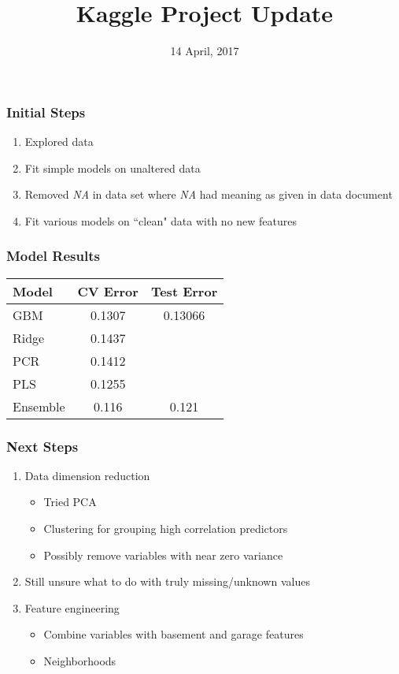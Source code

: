\documentclass[xcolor=dvipsnames]{beamer}
\title[Machine Learning]{Kaggle Project Update}
\author[Stat 602]{}
\date{14 April, 2017}
\begin{document}
\begin{frame}
\titlepage
\end{frame}

\begin{frame}\frametitle{Initial Steps}

\begin{enumerate}
\item Explored data
\item Fit simple models on unaltered data
\item Removed \emph{NA} in data set where \emph{NA} had meaning as given in data document
\item Fit various models on ``clean" data with no new features
\end{enumerate}

\end{frame}

\begin{frame}\frametitle{Model Results}

\begin{center}
\begin{tabular}{l c c}
	\hline
	Model & CV Error & Test Error \\
	\hline
	GBM & 0.1307 & 0.13066 \\
	Ridge & 0.1437 & \\
	PCR & 0.1412 & \\
	PLS & 0.1255 & \\
	Ensemble & 0.116 & 0.121 \\
	\hline
\end{tabular}
\end{center}
\end{frame}

\begin{frame}\frametitle{Next Steps}

\begin{enumerate}
\item Data dimension reduction
	\begin{itemize}
	\item Tried PCA
	\item Clustering for grouping high correlation predictors
	\item Possibly remove variables with near zero variance
	\end{itemize}
\item Still unsure what to do with truly missing/unknown values
\item Feature engineering
	\begin{itemize}
	\item Combine variables with basement and garage features
	\item Neighborhoods
	\end{itemize}
\end{enumerate}

\end{frame}
\end{document}
